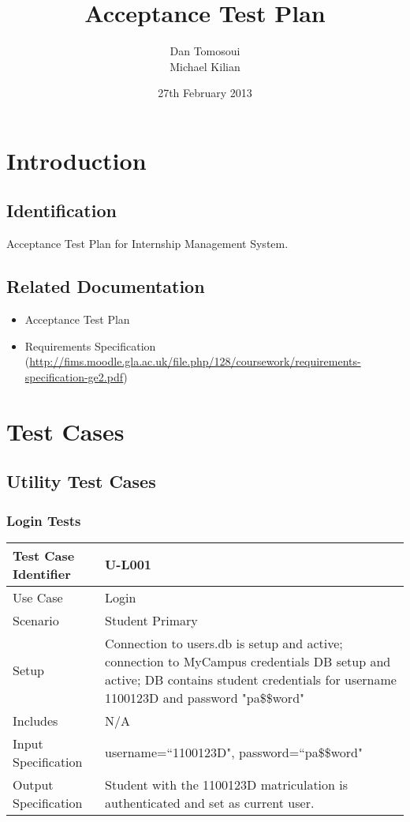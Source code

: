\documentclass{l3deliverable}
\title{Acceptance Test Plan}
\author{
  Dan Tomosoui\\
  Michael Kilian \\
}
\date{27th February 2013}
\begin{document}

\maketitle

\tableofcontents

\newpage


\section{Introduction}

\subsection{Identification}
Acceptance Test Plan for Internship Management System.

\subsection{Related Documentation}
\begin{itemize}
\item{Acceptance Test Plan}
\item{Requirements Specification (\url{http://fims.moodle.gla.ac.uk/file.php/128/coursework/requirements-specification-ge2.pdf})}
\end{itemize}

\newpage
\section{Test Cases}

\subsection{Utility Test Cases}

\subsubsection{Login Tests}
\begin{tabular}{lp{10cm}}
\hline 
\textbf{Test Case Identifier} & U-L001\tabularnewline
\hline 
\hline 
Use Case & Login \tabularnewline
\hline 
Scenario & Student Primary \tabularnewline
\hline 
Setup &  Connection to users.db is setup and active; connection to MyCampus credentials DB setup and active; DB contains student credentials for username 1100123D and password "pa\$\$word" \tabularnewline
\hline 
Includes &  N/A \tabularnewline
\hline 
Input Specification & username=``1100123D", password=``pa\$\$word"\tabularnewline
\hline 
Output Specification & Student with the 1100123D matriculation is authenticated and set as current user.\tabularnewline
\hline 
\end{tabular}\\
\end{document}
